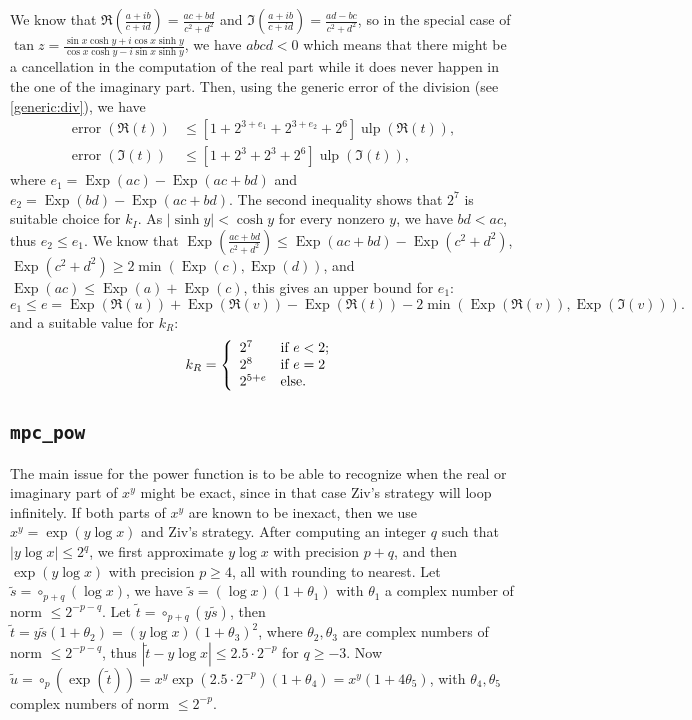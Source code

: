 \documentclass {article}
\newcommand {\Ulp}{{\operatorname {ulp}}}
\DeclareMathOperator{\Exp}{\operatorname {Exp}}
\newcommand{\error}{\operatorname {error}}
\renewcommand {\leq}{\leqslant}
\renewcommand {\geq}{\geqslant}
\begin{document}
We know that $\Re(\frac{a+i b}{c+i d})=\frac{a c +b d}{c^2 + d^2}$ and
$\Im(\frac{a+i b}{c+i d})=\frac{a d -b c}{c^2 + d^2}$, so in the special case
of $\tan z=\frac{\sin x\cosh y+i\cos x\sinh y}{\cos x\cosh y-i\sin x\sinh y}$,
we have $abcd < 0$ which means that there might be a cancellation in the
computation of the real part while it does never happen in the one of the
imaginary part.  Then, using the generic error of the division (see
\ref{generic:div}), we have
\begin{align*}
\error(\Re(t)) &\leq [1+2^{3+e_1}+2^{3+e_2}+2^6] \Ulp(\Re(t)),
\\
\error(\Im(t)) &\leq [1+2^3+2^3+2^6] \Ulp(\Im(t)),
\end{align*}
where $e_1=\Exp(a c) -\Exp(a c+b d)$ and $e_2=\Exp(b d) -\Exp(a c+b d)$.  The
second inequality shows that $2^7$ is suitable choice for $k_I$. As $|\sinh
y|<\cosh y$ for every nonzero $y$, we have $bd<ac$, thus $e_2\leq e_1$. We
know that $\Exp(\frac{a c+b d}{c^2+d^2})\leq \Exp(a c+b d) -\Exp(c^2+d^2)$,
$\Exp(c^2+d^2)\geq2 \min(\Exp(c), \Exp(d))$, and $\Exp(ac) \leq \Exp(a) +
\Exp(c)$, this gives an upper bound for $e_1$:
\[
e_1 \leq e = \Exp(\Re(u)) +\Exp(\Re(v)) -\Exp(\Re(t))
-2 \min(\Exp(\Re(v)), \Exp(\Im(v))).
\]
and a suitable value for $k_R$:
\begin{equation*}
k_R=\left\{
\begin{array}{l l}
  2^7 & \mbox{if $e < 2$;}
  \\
  2^8 & \mbox{if $e = 2$}
  \\
  2^{5 + e} & \mbox{else.}
\end{array}
\right.
\end{equation*}

\subsection {\texttt {mpc\_pow}}

The main issue for the power function is to be able to recognize when the
real or imaginary part of $x^y$ might be exact, since in that case
Ziv's strategy will loop infinitely.
If both parts of $x^y$ are known to be inexact, then we use
$x^y = \exp(y \log x)$ and Ziv's strategy.
After computing an integer $q$ such that $|y \log x| \leq 2^q$, we first
approximate $y \log x$ with precision $p + q$, and then
$\exp(y \log x)$ with precision $p \geq 4$, all with rounding
to nearest.
Let $\tilde{s} = \circ_{p+q}(\log x)$,
we have $\tilde{s} = (\log x) (1 + \theta_1)$
with $\theta_1$ a complex number of norm $\leq 2^{-p-q}$.
Let $\tilde{t} = \circ_{p+q}(y \tilde{s})$, then
$\tilde{t} = y \tilde{s} (1 + \theta_2) = (y \log x) (1 + \theta_3)^2$,
where $\theta_2, \theta_3$ are complex numbers of norm $\leq 2^{-p-q}$,
thus $|\tilde{t} - y \log x| \leq 2.5 \cdot 2^{-p}$ for $q \geq -3$.
Now $\tilde{u} = \circ_p(\exp(\tilde{t})) =
x^y \exp(2.5 \cdot 2^{-p}) (1 + \theta_4) = x^y (1 + 4 \theta_5)$,
with $\theta_4, \theta_5$ complex numbers of norm $\leq 2^{-p}$.
\end{document}
